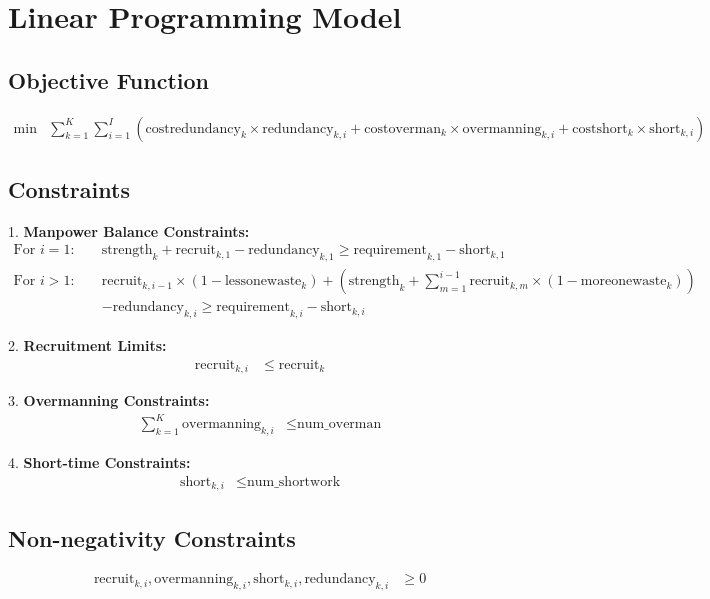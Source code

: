 \documentclass{article}
\begin{document}
\section*{Linear Programming Model}

\subsection*{Objective Function}
\begin{align*}
\min & \sum_{k=1}^{K} \sum_{i=1}^{I} \left( \text{costredundancy}_k \times \text{redundancy}_{k, i} + \text{costoverman}_k \times \text{overmanning}_{k, i} + \text{costshort}_k \times \text{short}_{k, i} \right)
\end{align*}

\subsection*{Constraints}
1. \textbf{Manpower Balance Constraints:}
\begin{align*}
\text{For } i = 1: \quad & \text{strength}_k + \text{recruit}_{k, 1} - \text{redundancy}_{k, 1} \geq \text{requirement}_{k, 1} - \text{short}_{k, 1} \\
\text{For } i > 1: \quad & \text{recruit}_{k, i-1} \times (1 - \text{lessonewaste}_k) + (\text{strength}_k + \sum_{m=1}^{i-1} \text{recruit}_{k, m} \times (1 - \text{moreonewaste}_k)) \\
& - \text{redundancy}_{k, i} \geq \text{requirement}_{k, i} - \text{short}_{k, i}
\end{align*}

2. \textbf{Recruitment Limits:}
\begin{align*}
\text{recruit}_{k, i} & \leq \text{recruit}_k
\end{align*}

3. \textbf{Overmanning Constraints:}
\begin{align*}
\sum_{k=1}^{K} \text{overmanning}_{k, i} & \leq \text{num\_overman}
\end{align*}

4. \textbf{Short-time Constraints:}
\begin{align*}
\text{short}_{k, i} & \leq \text{num\_shortwork}
\end{align*}

\subsection*{Non-negativity Constraints}
\begin{align*}
\text{recruit}_{k, i}, \text{overmanning}_{k, i}, \text{short}_{k, i}, \text{redundancy}_{k, i} & \geq 0
\end{align*}
\end{document}
